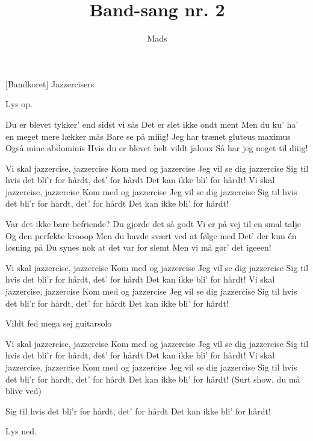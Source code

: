 \documentclass{ucph-revy}
\author{Mads}
\title{Band-sang nr. 2}
\begin{document}
\maketitle
	\begin{roles}
		[Bandkoret] Jazzercisers
	\end{roles}

	

\begin{song}

\scene Lys op.

 Du er blevet tykker’ end sidst vi sås
Det er slet ikke ondt ment
Men du ku’ ha’ en meget mere lækker mås
Bare se på miiig!
Jeg har trænet gluteus maximus
Også mine abdominis
Hvis du er blevet helt vildt jaloux
Så har jeg noget til diiig!



Vi skal jazzercise, jazzercise
Kom med og jazzercise
Jeg vil se dig jazzercise
Sig til hvis det bli’r for hårdt, det’ for hårdt
Det kan ikke bli’ for hårdt!
Vi skal jazzercise, jazzercise
Kom med og jazzercise
Jeg vil se dig jazzercise
Sig til hvis det bli’r for hårdt, det’ for hårdt
Det kan ikke bli’ for hårdt!



Var det ikke bare befriende?
Du gjorde det så godt
Vi er på vej til en smal talje
Og den perfekte krooop
Men du havde svært ved at følge med
Det’ der kun én løsning på
Du synes nok at det var for slemt
Men vi må gør’ det igeeen!


Vi skal jazzercise, jazzercise
Kom med og jazzercise
Jeg vil se dig jazzercise
Sig til hvis det bli’r for hårdt, det’ for hårdt
Det kan ikke bli’ for hårdt!
Vi skal jazzercise, jazzercise
Kom med og jazzercise
Jeg vil se dig jazzercise
Sig til hvis det bli’r for hårdt, det’ for hårdt
Det kan ikke bli’ for hårdt!

\scene Vildt fed mega sej guitarsolo

Vi skal jazzercise, jazzercise
Kom med og jazzercise
Jeg vil se dig jazzercise
Sig til hvis det bli’r for hårdt, det’ for hårdt
Det kan ikke bli’ for hårdt!
Vi skal jazzercise, jazzercise
Kom med og jazzercise
Jeg vil se dig jazzercise
Sig til hvis det bli’r for hårdt, det’ for hårdt
Det kan ikke bli’ for hårdt!
(Surt show, du må blive ved)

Sig til hvis det bli’r for hårdt, det’ for hårdt
Det kan ikke bli’ for hårdt!


\scene Lys ned. %

\end{song}
\end{document}
